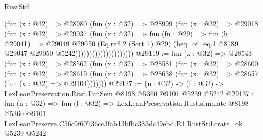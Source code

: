 \begin{lexlean}{RustStd}
\begin{coremodule}
                                  (fun (x : @32) =>
                                  @28980
                                    (fun (x : @32) =>
                                    @28999
                                      (fun (x : @32) =>
                                      @29018
                                        (fun (x : @32) =>
                                        @29037
                                          (fun (x : @32) =>
                                          fun (fn : @29) =>
                                          fun (h : @29041) =>
                                          @29049
                                            @29050
                                            (Eq.refl.{2} (Sort 1) @29)
                                            (heq_of_eq.{1}
                                              @8189
                                              @29047
                                              @29050
                                              @5242)))))))))))))))))))))
@29119 := fun (x : @32) =>
  @28543
    (fun (x : @32) =>
    @28562
      (fun (x : @32) =>
      @28581
        (fun (x : @32) =>
        @28600
          (fun (x : @32) =>
          @28619 (fun (x : @32) => @28638 (fun (x : @32) => @28657 (fun (x : @32) => @29104)))))))
@29127 := (n : @32) -> (f : @32) -> LexLeanPreservation.Rust.FunSem @8198 @5360 @9101 @5239 @5242
@29137 := fun (n : @32) =>
  fun (f : @32) =>
  LexLeanPreservation.Rust.simulate
    @8198
    @5360
    @9101
    LexLeanPreserve.C56c9f60736cc3fab13bfbc383dc49ebd.R1.RustStd.crate_ok
    @5239
    @5242
\end{coremodule}
\end{lexlean}
